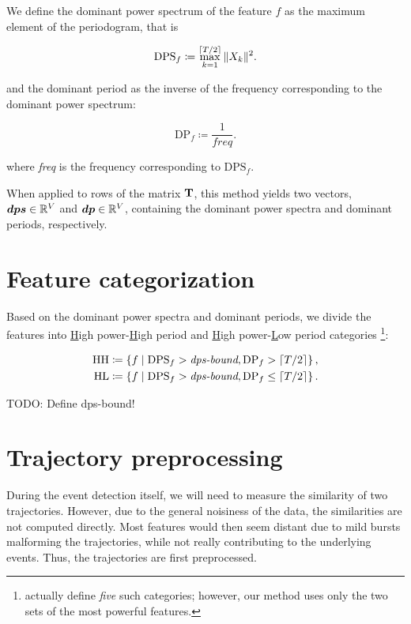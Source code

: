 We define the dominant power spectrum of the feature $f$ as the maximum element of the periodogram, that is

\begin{equation}
	\text{DPS}_{f} \coloneqq \max_{k = 1}^{\lceil T / 2\rceil}{\|X_{k}\|^{2}}.
\end{equation}

and the dominant period as the inverse of the frequency corresponding to the dominant power spectrum:

\begin{equation}
	\text{DP}_{f} \coloneqq \frac{1}{\mathit{freq}}.
\end{equation}

where \textit{freq} is the frequency corresponding to $\text{DPS}_{f}$.

When applied to rows of the matrix $\mathbf{T}$, this method yields two vectors, $\vect{DPS} \in \R^{\featcount}$ and $\vect{DP} \in \R^{\featcount}$, containing the dominant power spectra and dominant periods, respectively.


\section{Feature categorization}
Based on the dominant power spectra and dominant periods, we divide the features into \underline{H}igh power-\underline{H}igh period and \underline{H}igh power-\underline{L}ow period categories \footnote{\cite{event-detection} actually define \textit{five} such categories; however, our method uses only the two sets of the most powerful features.}:

\begin{equation}
\begin{split}
	\text{HH} \coloneqq \left\{ f \mid \text{DPS}_{f} > \textit{dps-bound}, \text{DP}_{f} > \lceil T / 2\rceil \right\}, \\
	\text{HL} \coloneqq \left\{ f \mid \text{DPS}_{f} > \textit{dps-bound}, \text{DP}_{f} \leq \lceil T / 2\rceil \right\}.
\end{split}
\end{equation}

{\color{red}TODO: Define dps-bound!}


\section{Trajectory preprocessing}
During the event detection itself, we will need to measure the similarity of two trajectories. However, due to the general noisiness of the data, the similarities are not computed directly. Most features would then seem distant due to mild bursts malforming the trajectories, while not really contributing to the underlying events. Thus, the trajectories are first preprocessed.

